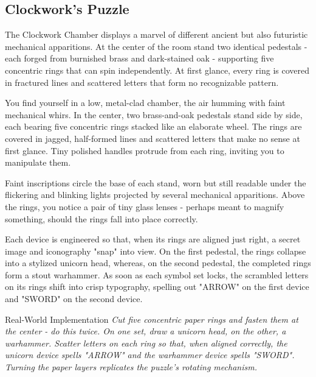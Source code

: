 \subsection*{Clockwork's Puzzle}
{\entryfont The Clockwork Chamber displays a marvel of different ancient but also futuristic mechanical apparitions. At the center of the room stand two identical pedestals - each forged from burnished brass and dark-stained oak - supporting five concentric rings that can spin independently. At first glance, every ring is covered in fractured lines and scattered letters that form no recognizable pattern.}
\begin{DndReadAloud}
	You find yourself in a low, metal-clad chamber, the air humming with faint mechanical whirs. In the center, two brass-and-oak pedestals stand side by side, each bearing five concentric rings stacked like an elaborate wheel. The rings are covered in jagged, half-formed lines and scattered letters that make no sense at first glance. Tiny polished handles protrude from each ring, inviting you to manipulate them.

	Faint inscriptions circle the base of each stand, worn but still readable under the flickering and blinking lights projected by several mechanical apparitions. Above the rings, you notice a pair of tiny glass lenses - perhaps meant to magnify something, should the rings fall into place correctly.
\end{DndReadAloud}
{\noindent\entryfont Each device is engineered so that, when its rings are aligned just right, a secret image and iconography "snap" into view. On the first pedestal, the rings collapse into a stylized unicorn head, whereas, on the second pedestal, the completed rings form a stout warhammer. As soon as each symbol set locks, the scrambled letters on its rings shift into crisp typography, spelling out "ARROW" on the first device and "SWORD" on the second device.}
\begingroup
	\DndSetThemeColor[DmgSlateGray]
	\begin{DndComment}{Real-World Implementation}
		\textit{Cut five concentric paper rings and fasten them at the center - do this twice. On one set, draw a unicorn head, on the other, a warhammer. Scatter letters on each ring so that, when aligned correctly, the unicorn device spells "ARROW" and the warhammer device spells "SWORD". Turning the paper layers replicates the puzzle's rotating mechanism.}
	\end{DndComment}
\endgroup

